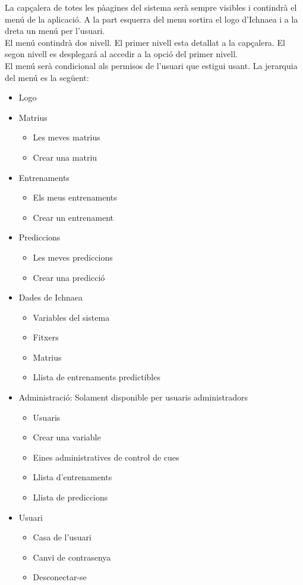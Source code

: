 La capçalera de totes les p\`{a}agines del sistema serà sempre visibles i contindrà el menú de la aplicació. A la part esquerra del menu sortira el logo d'Ichnaea i a la dreta un menú per l'usuari.\\

El menú contindrà dos nivell. El primer nivell esta detallat a la capçalera. El segon nivell es desplegar\'{a} al accedir a la opci\'{o} del primer nivell.\\

El menú serà condicional als permisos de l'usuari que estigui usant. La jerarquia del menú es la següent:
\begin{itemize}
\item Logo
\item Matrius
 \begin{itemize}
 \item Les meves matrius
 \item Crear una matriu
  \end{itemize}
\item Entrenaments
 \begin{itemize}
 \item Els meus entrenaments
 \item Crear un entrenament
 \end{itemize} 
\item Prediccions
 \begin{itemize}
 \item Les meves prediccions
 \item Crear una predicció
 \end{itemize} 
\item Dades de Ichnaea 
 \begin{itemize}
 \item Variables del sistema
 \item Fitxers
 \item Matrius
 \item Llista de entrenaments predictibles
 \end{itemize} 
\item Administració: Solament disponible per usuaris administradors
\begin{itemize}
\item Usuaris
\item Crear una variable
\item Eines administratives de control de cues
\item Llista d'entrenaments
\item Llista de prediccions
\end{itemize}
\item Usuari
 \begin{itemize}
 \item Casa de l'usuari
 \item Canvi de contrasenya
 \item Desconectar-se
 \end{itemize}
\end{itemize}

